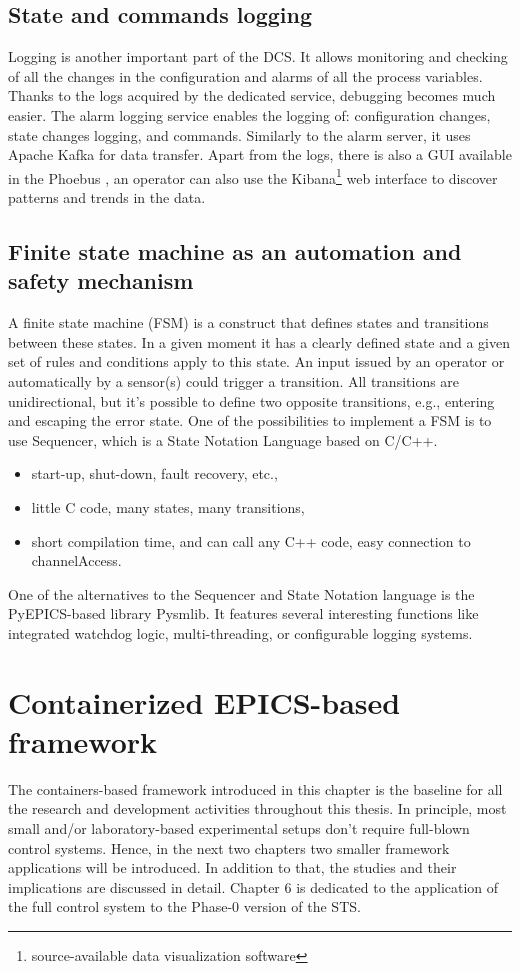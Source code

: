 \subsection{State and commands logging}
Logging is another important part of the \gls{DCS}. It allows monitoring and checking of all the changes in the configuration and alarms of all the process variables. Thanks to the logs acquired by the dedicated service, debugging becomes much easier. The alarm logging service enables the logging of: configuration changes, state changes logging, and commands. Similarly to the alarm server, it uses Apache Kafka for data transfer. Apart from the logs, there is also a \gls{GUI} available in the Phoebus \cite{alarm_logger}, an operator can also use the Kibana\footnote{source-available data visualization software} web interface to discover patterns and trends in the data. 

\subsection{Finite state machine as an automation and safety mechanism}
A finite state machine (\gls{FSM}) is a construct that defines states and transitions between these states. In a given moment it has a clearly defined state and a given set of rules and conditions apply to this state. An input issued by an operator or automatically by a sensor(s) could trigger a transition. All transitions are unidirectional, but it's possible to define two opposite transitions, e.g., entering and escaping the error state. 
\newpage
One of the possibilities to implement a \gls{FSM} is to use Sequencer, which is a State Notation Language based on C/C++. 
\begin{itemize}
    \item start-up, shut-down, fault recovery, etc.,
    \item little C code, many states, many transitions,
    \item short compilation time, and can call any C++ code, easy connection to channelAccess.
\end{itemize}

One of the alternatives to the Sequencer and State Notation language is the PyEPICS-based library Pysmlib\cite{pysmlib}. It features several interesting functions like integrated watchdog logic, multi-threading, or configurable logging systems.


\section{Containerized EPICS-based framework}

The containers-based framework introduced in this chapter is the baseline for all the research and development activities throughout this thesis. In principle, most small and/or laboratory-based experimental setups don't require full-blown control systems. Hence, in the next two chapters two smaller framework applications will be introduced. In addition to that, the studies and their implications are discussed in detail. Chapter 6 is dedicated to the application of the full control system to the Phase-0 version of the \gls{STS}.